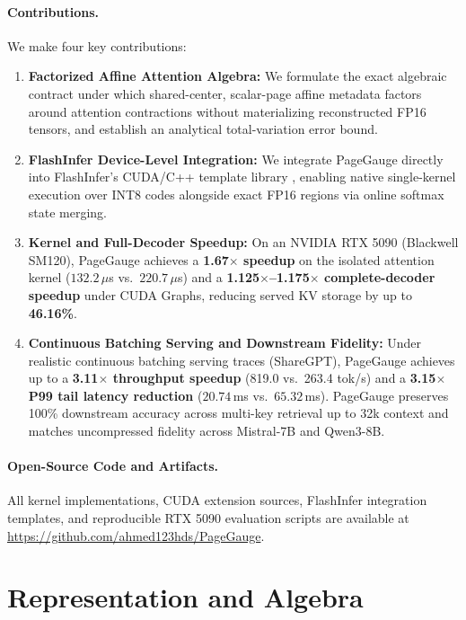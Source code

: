 \documentclass{article}
\begin{document}
\paragraph{Contributions.}
We make four key contributions:
\begin{enumerate}
    \item \textbf{Factorized Affine Attention Algebra:} We formulate the exact algebraic contract under which shared-center, scalar-page affine metadata factors around attention contractions without materializing reconstructed FP16 tensors, and establish an analytical total-variation error bound.
    \item \textbf{FlashInfer Device-Level Integration:} We integrate PageGauge directly into FlashInfer's CUDA/C++ template library \citep{ye2025flashinfer}, enabling native single-kernel execution over INT8 codes alongside exact FP16 regions via online softmax state merging.
    \item \textbf{Kernel and Full-Decoder Speedup:} On an NVIDIA RTX 5090 (Blackwell SM120), PageGauge achieves a \textbf{1.67$\times$ speedup} on the isolated attention kernel ($132.2\,\mu$s vs.\ $220.7\,\mu$s) and a \textbf{1.125$\times$--1.175$\times$ complete-decoder speedup} under CUDA Graphs, reducing served KV storage by up to \textbf{46.16\%}.
    \item \textbf{Continuous Batching Serving and Downstream Fidelity:} Under realistic continuous batching serving traces (ShareGPT), PageGauge achieves up to a \textbf{3.11$\times$ throughput speedup} (819.0 vs.\ 263.4 tok/s) and a \textbf{3.15$\times$ P99 tail latency reduction} ($20.74$\,ms vs.\ $65.32$\,ms). PageGauge preserves 100\% downstream accuracy across multi-key retrieval up to 32k context and matches uncompressed fidelity across Mistral-7B and Qwen3-8B.
\end{enumerate}

\paragraph{Open-Source Code and Artifacts.}
All kernel implementations, CUDA extension sources, FlashInfer integration templates, and reproducible RTX 5090 evaluation scripts are available at \url{https://github.com/ahmed123hds/PageGauge}.



\section{Representation and Algebra}
\end{document}
